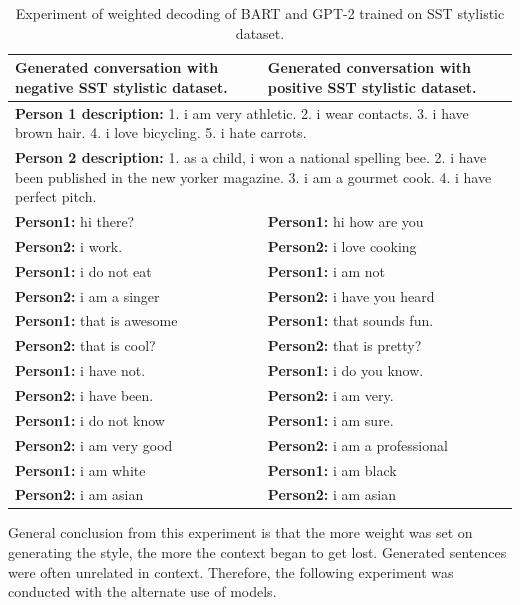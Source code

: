 \begin{table}
\centering
 \begin{tabular}{|p{7cm}|p{7cm}|} 
 \hline
 \textbf{Generated conversation with negative SST stylistic dataset.} & \textbf{Generated conversation with positive SST stylistic dataset.}\\
 \hline
 \multicolumn{2}{|p{14cm}|}{\textbf{Person 1 description:} 1. i am very athletic. 2. i wear contacts. 3. i have brown hair. 4. i love bicycling. 5. i hate carrots.} \\
 \hline
 \multicolumn{2}{|p{14cm}|}{\textbf{Person 2 description:} 1. as a child, i won a national spelling bee. 2. i have been published in the new yorker magazine. 3. i am a gourmet cook. 4. i have perfect pitch.} \\
 \hline
 \textbf{Person1:} hi there? & \textbf{Person1:} hi how are you \\
 \textbf{Person2:} i work. &  \textbf{Person2:} i love cooking \\ 
 \textbf{Person1:} i do not eat & \textbf{Person1:} i am not \\
 \textbf{Person2:} i am a singer & \textbf{Person2:} i have you heard \\
 \textbf{Person1:} that is awesome & \textbf{Person1:} that sounds fun. \\
 \textbf{Person2:} that is cool? & \textbf{Person2:} that is pretty?  \\
 \textbf{Person1:} i have not. & \textbf{Person1:} i do you know. \\
 \textbf{Person2:} i have been. & \textbf{Person2:} i am very. \\
 \textbf{Person1:} i do not know & \textbf{Person1:} i am sure. \\
 \textbf{Person2:} i am very good & \textbf{Person2:} i am a professional \\
 \textbf{Person1:} i am white & \textbf{Person1:} i am black \\
 \textbf{Person2:} i am asian & \textbf{Person2:} i am asian \\
 \hline
 \end{tabular}
 \caption{Experiment of weighted decoding of BART and GPT-2 trained on SST stylistic dataset.}
\label{tab:sst_wd}
\end{table}

General conclusion from this experiment is that the more weight was set on generating the style, the more the context began to get lost. Generated sentences were often unrelated in context. Therefore, the following experiment was conducted with the alternate use of models.

